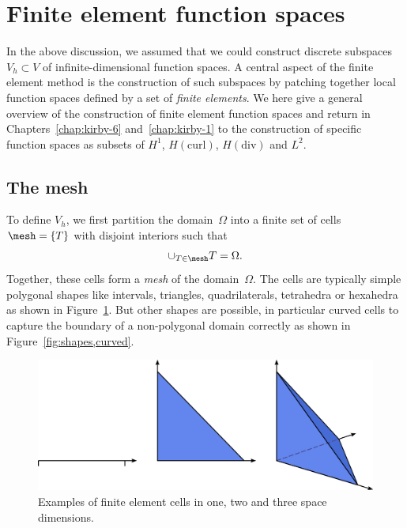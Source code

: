 \section{Finite element function spaces}

In the above discussion, we assumed that we could construct discrete
subspaces $V_h \subset V$ of infinite-dimensional function spaces. A
central aspect of the finite element method is the construction of
such subspaces by patching together local function spaces defined by a
set of \emph{finite elements}. We here give a general overview of the
construction of finite element function spaces and return in
Chapters~\ref{chap:kirby-6} and~\ref{chap:kirby-1} to the construction
of specific function spaces as subsets of $H^1$, $H(\mathrm{curl})$,
$H(\mathrm{div})$ and $L^2$.

\subsection{The mesh}

To define $V_h$, we first partition the domain~$\Omega$ into a finite
set of cells $\mesh = \{T\}$ with disjoint interiors such that
\begin{equation}
  \cup_{T\in\mesh} T = \Omega.
\end{equation}
Together, these cells form a \emph{mesh} of the domain~$\Omega$. The
cells are typically simple polygonal shapes like intervals, triangles,
quadrilaterals, tetrahedra or hexahedra as shown in
Figure~\ref{fig:shapes}. But other shapes are possible, in particular
curved cells to capture the boundary of a non-polygonal domain
correctly as shown in Figure~\ref{fig:shapes,curved}.

\begin{figure}
  \begin{center}
      \includegraphics[width=\largefig]{chapters/kirby-7/pdf/cells.pdf}
      \caption{Examples of finite element cells in one, two and three
        space dimensions.}
    \label{fig:shapes}
  \end{center}
\end{figure}

